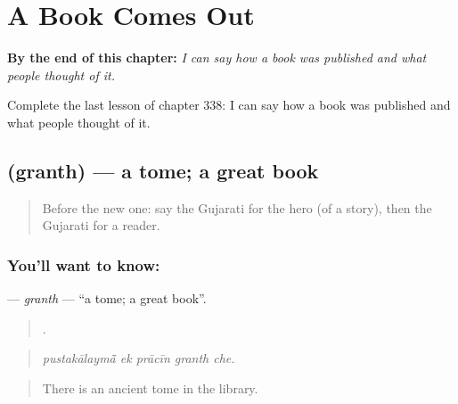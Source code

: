 
\chapter{A Book Comes Out}
\label{ch:gu-a-book-comes-out}

\begin{chapteropening}
\textbf{By the end of this chapter:} \emph{I can say how a book was published and what people thought of it.}

Complete the last lesson of chapter 338: I can say how a book was published and what people thought of it.
\end{chapteropening}

\section[\texorpdfstring{\gu{ગ્રંથ} (granth)}{ગ્રંથ (granth)}]{ (granth) — a tome; a great book}

\label{lesson:GU-C338-granth}



\begin{quote}
Before the new one: say the Gujarati for the hero (of a story), then the Gujarati for a reader.
\end{quote}

\subsection*{You'll want to know: }
\textbf{} — \emph{granth} — \textquotedblleft{}a tome; a great book\textquotedblright{}.

\begin{quote}
    .
\end{quote}

\begin{quote}
\emph{pustakālaymā̃ ek prācīn granth che.}
\end{quote}

\begin{quote}
There is an ancient tome in the library.
\end{quote}

